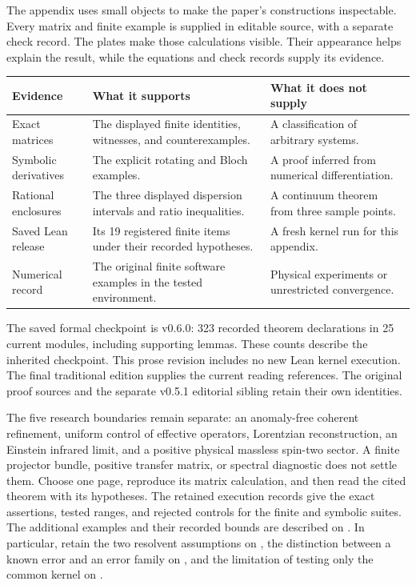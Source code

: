 The appendix uses small objects to make the paper's constructions inspectable. Every matrix and finite example is supplied in editable source, with a separate check record. The plates make those calculations visible. Their appearance helps explain the result, while the equations and check records supply its evidence.
\par\vspace{4pt}
\begin{tabularx}{\linewidth}{@{}p{.24\linewidth}YY@{}}
\toprule
Evidence & What it supports & What it does not supply\\\midrule
Exact matrices & The displayed finite identities, witnesses, and counterexamples. & A classification of arbitrary systems.\\
Symbolic derivatives & The explicit rotating and Bloch examples. & A proof inferred from numerical differentiation.\\
Rational enclosures & The three displayed dispersion intervals and ratio inequalities. & A continuum theorem from three sample points.\\
Saved Lean release & Its 19 registered finite items under their recorded hypotheses. & A fresh kernel run for this appendix.\\
Numerical record & The original finite software examples in the tested environment. & Physical experiments or unrestricted convergence.\\\bottomrule
\end{tabularx}
The saved formal checkpoint is v0.6.0: 323 recorded theorem declarations in 25 current modules, including supporting lemmas. These counts describe the inherited checkpoint. This prose revision includes no new Lean kernel execution. The final traditional edition supplies the current reading references. The original proof sources and the separate v0.5.1 editorial sibling retain their own identities.

The five research boundaries remain separate: an anomaly-free coherent refinement, uniform control of effective operators, Lorentzian reconstruction, an Einstein infrared limit, and a positive physical massless spin-two sector. A finite projector bundle, positive transfer matrix, or spectral diagnostic does not settle them.
Choose one page, reproduce its matrix calculation, and then read the cited theorem with its hypotheses. The retained execution records give the exact assertions, tested ranges, and rejected controls for the finite and symbolic suites. The additional examples and their recorded bounds are described on . In particular, retain the two resolvent assumptions on , the distinction between a known error and an error family on , and the limitation of testing only the common kernel on .
